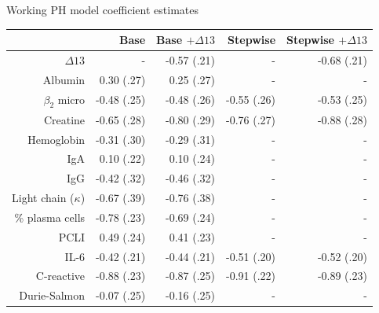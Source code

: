 \documentclass[11pt]{beamer}
\begin{document}
\begin{frame}{Working PH model coefficient estimates}
\begin{footnotesize}
\begin{table}[ht]
\begin{center}
\begin{tabular}{rrrrr}
  \hline
 & Base & Base $+ \Delta 13$ & Stepwise & Stepwise $+ \Delta 13$ \\ 
  \hline
$\Delta 13$ & - & -0.57   (.21)& - & -0.68 (.21)\\ 
 Albumin  & 0.30 (.27)& 0.25   (.27)& - & - \\ 
 $\beta_2$ micro & -0.48 (.25)  & -0.48 (.26)& -0.55 (.26) & -0.53 (.25)\\ 
 Creatine & -0.65 (.28)  & -0.80 (.29)& -0.76 (.27)& -0.88 (.28)\\ 
 Hemoglobin& -0.31 (.30)  & -0.29 (.31)& - & - \\ 
 IgA & 0.10 (.22) & 0.10   (.24)& - & - \\ 
 IgG & -0.42 (.32)& -0.46   (.32)& - & - \\ 
 Light chain ($\kappa$) & -0.67  (.39) & -0.76 (.38)& - & - \\ 
 \% plasma cells  & -0.78 (.23)  & -0.69 (.24)& - & - \\ 
 PCLI & 0.49 (.24)  & 0.41 (.23)& - & - \\ 
  IL-6 & -0.42 (.21) & -0.44 (.21)& -0.51 (.20)& -0.52 (.20)\\ 
  C-reactive & -0.88 (.23)& -0.87 (.25)& -0.91 (.22)& -0.89 (.23)\\ 
  Durie-Salmon & -0.07 (.25)& -0.16 (.25)& - & - \\ 
   \hline
\end{tabular}
\end{center}
\end{table}
\end{footnotesize}
\end{frame}
\end{document}
